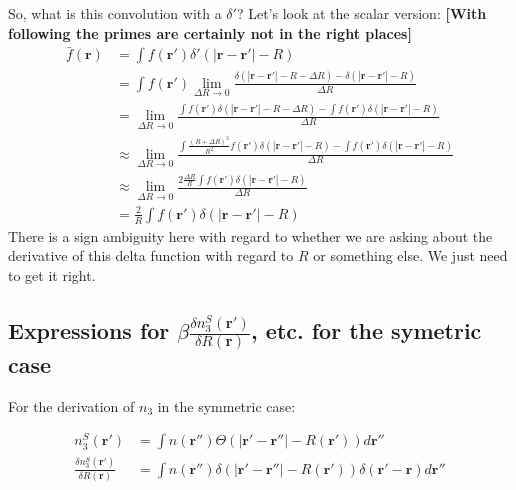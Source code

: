 \documentclass[letterpaper,twocolumn,amsmath,amssymb,jcp,10pt,aip]{revtex4-1}
\newcommand{\red}[1]{{\bf \color{red} #1}}
\newcommand{\fixme}[1]{\red{[#1]}}
\begin{document}
\begin{widetext}
So, what is this convolution with a $\delta'$? Let's look at the
scalar version:
\fixme{With following the primes are certainly not in the right places}
\begin{align}
  \bar{f}(\mathbf{r})
  &= \int f(\mathbf{r'}) \delta'(|\mathbf{r}-\mathbf{r'}| - R)
  \\
  &= \int
        f(\mathbf{r'})
        \lim_{\Delta R \rightarrow 0}
          \frac{\delta(|\mathbf{r}-\mathbf{r'}| - R - \Delta R)
            -
            \delta(|\mathbf{r}-\mathbf{r'}| - R)
      }{\Delta R}
  \\
  &= \lim_{\Delta R \rightarrow 0}
          \frac{\int
            f(\mathbf{r'})
            \delta(|\mathbf{r}-\mathbf{r'}| - R - \Delta R)
            -
            \int
            f(\mathbf{r'})
            \delta(|\mathbf{r}-\mathbf{r'}| - R)
      }{\Delta R}
  \\
  &\approx\lim_{\Delta R \rightarrow 0}
          \frac{\int
            \frac{(R+\Delta R)^2}{R^2}f(\mathbf{r'})
            \delta(|\mathbf{r}-\mathbf{r'}| - R)
            -
            \int
            f(\mathbf{r'})
            \delta(|\mathbf{r}-\mathbf{r'}| - R)
      }{\Delta R}
  \\
  &\approx\lim_{\Delta R \rightarrow 0}
          \frac{2\frac{\Delta R}{R} \int
            f(\mathbf{r'})
            \delta(|\mathbf{r}-\mathbf{r'}| - R)
      }{\Delta R}
  \\
  &= \frac{2}{R} \int
            f(\mathbf{r'})
            \delta(|\mathbf{r}-\mathbf{r'}| - R)
\end{align}
There is a sign ambiguity here with regard to whether we are asking
about the derivative of this delta function with regard to $R$ or
something else.  We just need to get it right.

\subsection{Expressions for $\beta\frac{\delta n_3^{S}(\mathbf{r}')}{\delta R(\mathbf{r})}$, etc. for the symetric case}\label{appendix:g-S}


For the derivation of $n_{3}$ in the symmetric case:

\begin{align}  
  n_3^{S}(\mathbf{r}') &= \int n(\mathbf{r}'') \Theta(\left|\mathbf{r}' - \mathbf{r}''\right| -R(\mathbf{r}')) d\mathbf{r}''\\
  \frac{\delta n_3^{S} (\mathbf{r}')}{\delta R(\mathbf{r})} &=
  \int n (\mathbf{r}'') \delta(|\mathbf{r}' - \mathbf{r}''| - R(\mathbf{r}')) \delta(\mathbf{r}'-\mathbf{r}) d\mathbf{r}''
\end{align}
  

\end{widetext}
\end{document}
